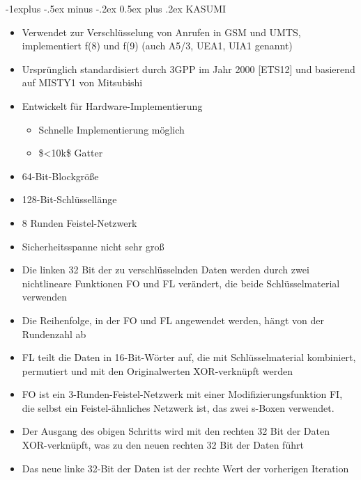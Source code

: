 \documentclass[a4paper]{article}
\makeatletter
\renewcommand{\subsection}{\@startsection{subsection}{2}{0mm}%
 {-1explus -.5ex minus -.2ex}%
 {0.5ex plus .2ex}%
 {\normalfont\normalsize\bfseries}}
\makeatother
\begin{document}
\begin{multicols}{3}
    \subsection{KASUMI}

    \begin{itemize}
        \item
              Verwendet zur Verschlüsselung von Anrufen in GSM und UMTS,
              implementiert f(8) und f(9) (auch A5/3, UEA1, UIA1 genannt)
        \item
              Ursprünglich standardisiert durch 3GPP im Jahr 2000 {[}ETS12{]} und
              basierend auf MISTY1 von Mitsubishi
        \item
              Entwickelt für Hardware-Implementierung

              \begin{itemize}
                  \item
                        Schnelle Implementierung möglich
                  \item
                        \$\textless10k\$ Gatter
              \end{itemize}
        \item
              64-Bit-Blockgröße
        \item
              128-Bit-Schlüssellänge
        \item
              8 Runden Feistel-Netzwerk
        \item
              Sicherheitsspanne nicht sehr groß
    \end{itemize}


    \begin{itemize}
        \item
              Die linken 32 Bit der zu verschlüsselnden Daten werden durch zwei
              nichtlineare Funktionen FO und FL verändert, die beide
              Schlüsselmaterial verwenden
        \item
              Die Reihenfolge, in der FO und FL angewendet werden, hängt von der
              Rundenzahl ab
        \item
              FL teilt die Daten in 16-Bit-Wörter auf, die mit Schlüsselmaterial
              kombiniert, permutiert und mit den Originalwerten XOR-verknüpft werden
        \item
              FO ist ein 3-Runden-Feistel-Netzwerk mit einer Modifizierungsfunktion
              FI, die selbst ein Feistel-ähnliches Netzwerk ist, das zwei s-Boxen
              verwendet.
        \item
              Der Ausgang des obigen Schritts wird mit den rechten 32 Bit der Daten
              XOR-verknüpft, was zu den neuen rechten 32 Bit der Daten führt
        \item
              Das neue linke 32-Bit der Daten ist der rechte Wert der vorherigen
              Iteration
    \end{itemize}



\end{multicols}
\end{document}
